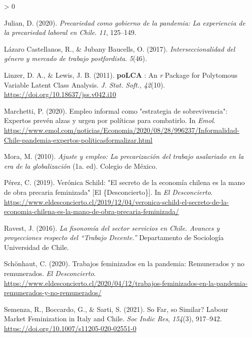 \documentclass[
]{article}
\newlength{\cslhangindent}
\newenvironment{CSLReferences}[2] %
 {%
  \setlength{\parindent}{0pt}
  \ifodd #1 \everypar{\setlength{\hangindent}{\cslhangindent}}\ignorespaces\fi
  \ifnum #2 > 0
  \setlength{\parskip}{#2\baselineskip}
  \fi
 }%
 {}
\begin{document}
\begin{CSLReferences}{1}{0}
\leavevmode\hypertarget{ref-julian2020}{}%
Julian, D. (2020). \emph{Precariedad como gobierno de la pandemia: {La}
experiencia de la precariedad laboral en {Chile}}. \emph{11}, 125--149.

\leavevmode\hypertarget{ref-lazarocastellanos2017}{}%
Lázaro Castellanos, R., \& Jubany Baucells, O. (2017).
\emph{Interseccionalidad del género y mercado de trabajo postfordista}.
\emph{5}(46).

\leavevmode\hypertarget{ref-linzer2011}{}%
Linzer, D. A., \& Lewis, J. B. (2011). \textbf{poLCA} : {An} \emph{r}
{Package} for {Polytomous} {Variable} {Latent} {Class} {Analysis}.
\emph{J. Stat. Soft.}, \emph{42}(10).
\url{https://doi.org/10.18637/jss.v042.i10}

\leavevmode\hypertarget{ref-marchetti2020}{}%
Marchetti, P. (2020). Empleo informal como "estrategia de
sobrevivencia": {Expertos} prevén alzas y urgen por políticas para
combatirlo. In \emph{Emol}.
\url{https://www.emol.com/noticias/Economia/2020/08/28/996237/Informalidad-Chile-pandemia-expertos-politicasformalizar.html}

\leavevmode\hypertarget{ref-mora2010}{}%
Mora, M. (2010). \emph{Ajuste y empleo: La precarización del trabajo
asalariado en la era de la globalización} (1a. ed). Colegio de México.

\leavevmode\hypertarget{ref-perez2019}{}%
Pérez, C. (2019). Verónica {Schild}: "{El} secreto de la economía
chilena es la mano de obra precaria feminizada" {[}El
\{Desconcierto\}{]}. In \emph{El Desconcierto}.
\url{https://www.eldesconcierto.cl/2019/12/04/veronica-schild-el-secreto-de-la-economia-chilena-es-la-mano-de-obra-precaria-feminizada/}

\leavevmode\hypertarget{ref-ravest2016}{}%
Ravest, J. (2016). \emph{La fisonomía del sector servicios en {Chile}.
{Avances} y proyecciones respecto del {``{Trabajo} {Decente}.''}}
Departamento de Sociología Universidad de Chile.

\leavevmode\hypertarget{ref-schonhaut2020}{}%
Schönhaut, C. (2020). Trabajos feminizados en la pandemia: Remunerados y
no remunerados. \emph{El Desconcierto}.
\url{https://www.eldesconcierto.cl/2020/04/12/trabajos-feminizados-en-la-pandemia-remunerados-y-no-remunerados/}

\leavevmode\hypertarget{ref-semenza2021}{}%
Semenza, R., Boccardo, G., \& Sarti, S. (2021). So {Far}, so {Similar}?
{Labour} {Market} {Feminization} in {Italy} and {Chile}. \emph{Soc Indic
Res}, \emph{154}(3), 917--942.
\url{https://doi.org/10.1007/s11205-020-02551-0}


\end{CSLReferences}
\end{document}
